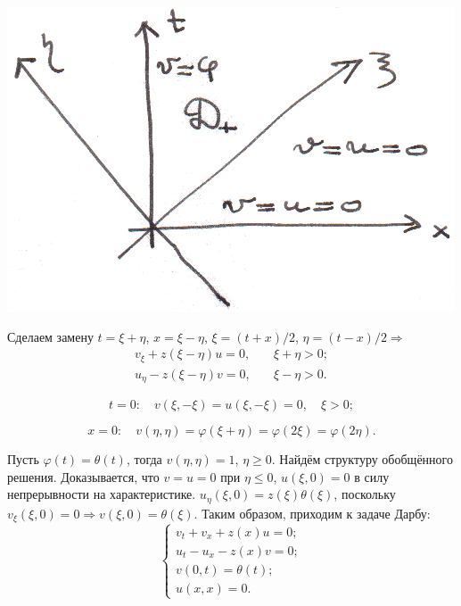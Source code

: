 \documentclass{article}
\begin{document}
\hspace{0.2cm}
\includegraphics[scale=0.8]{pic9_1.png}
\hspace{0.2cm}

Сделаем замену $t = \xi + \eta$, $ x = \xi - \eta$, $\xi = (t+x)/2$, $\eta = (t - x)/2 \Rightarrow$
\begin{align*}
	v_{\xi} + z(\xi - \eta) u = 0, \quad & \xi + \eta > 0;\\
	u_{\eta} - z(\xi - \eta)v = 0, \quad & \xi - \eta > 0.
\end{align*}

\begin{equation*}
	t = 0: \quad
	v(\xi , -\xi) = u(\xi, - \xi) = 0, \quad \xi > 0;
\end{equation*}

\begin{equation*}
	x = 0: \quad
	v(\eta , \eta) = \varphi(\xi + \eta) =  \varphi(2 \xi) = \varphi(2 \eta).
\end{equation*}

Пусть $\varphi(t) = \theta(t)$, тогда $v(\eta, \eta) = 1$, $\eta \geqslant 0 $. 
Найдём структуру обобщённого решения.
Доказывается, что $v=u=0$ при $\eta \leqslant 0$, $u(\xi,0) = 0$ в силу непрерывности на характеристике. 
$u_{\eta}(\xi,0) = z(\xi)\theta(\xi)$, поскольку $v_{\xi}(\xi,0) = 0 \Rightarrow v(\xi,0) = \theta(\xi)$. 
Таким образом, приходим к задаче Дарбу:
\begin{equation*}
\begin{cases}
	v_t + v_x + z(x) u =0;\\
	u_t - u_x - z(x) v = 0;\\
	v(0,t) = \theta(t);\\
	u(x,x) = 0.
\end{cases}
\end{equation*}
\end{document}
